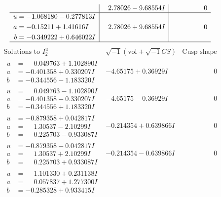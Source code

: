 \documentclass[1p]{elsarticle_modified}
\theoremstyle{definition}
\newcommand{\I}{\sqrt{-1}}
\begin{document}
$$\begin{array}{c|c|c}
 & \phantom{-}2.78026 - 9.68554 I & \phantom{-0.000000 } 0 \\ \hline\begin{aligned}
u &= -1.068180 - 0.277813 I \\
a &= -0.15211 + 1.41616 I \\
b &= -0.349222 + 0.646022 I\end{aligned}
 & \phantom{-}2.78026 + 9.68554 I & \phantom{-0.000000 } 0\\
 \hline 
 \end{array}$$\newpage$$\begin{array}{c|c|c}  
\text{Solutions to }I^u_{2}& \I (\text{vol} + \sqrt{-1}CS) & \text{Cusp shape}\\
 \hline 
\begin{aligned}
u &= \phantom{-}0.049763 + 1.102890 I \\
a &= -0.401358 + 0.330207 I \\
b &= -0.344556 - 1.183320 I\end{aligned}
 & -4.65175 + 0.36929 I & \phantom{-0.000000 } 0 \\ \hline\begin{aligned}
u &= \phantom{-}0.049763 - 1.102890 I \\
a &= -0.401358 - 0.330207 I \\
b &= -0.344556 + 1.183320 I\end{aligned}
 & -4.65175 - 0.36929 I & \phantom{-0.000000 } 0 \\ \hline\begin{aligned}
u &= -0.879358 + 0.042817 I \\
a &= \phantom{-}1.30537 - 2.10299 I \\
b &= \phantom{-}0.225703 - 0.933087 I\end{aligned}
 & -0.214354 + 0.639866 I & \phantom{-0.000000 } 0 \\ \hline\begin{aligned}
u &= -0.879358 - 0.042817 I \\
a &= \phantom{-}1.30537 + 2.10299 I \\
b &= \phantom{-}0.225703 + 0.933087 I\end{aligned}
 & -0.214354 - 0.639866 I & \phantom{-0.000000 } 0 \\ \hline\begin{aligned}
u &= \phantom{-}1.101330 + 0.231138 I \\
a &= \phantom{-}0.057837 + 1.277300 I \\
b &= -0.285328 + 0.933415 I\end{aligned}

\end{array}$$
\end{document}
